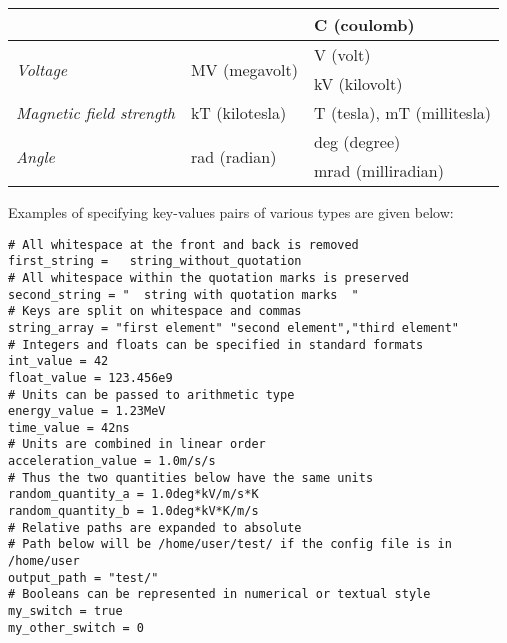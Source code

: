 \begin{table}[tbp]
\begin{tabular}{lll}
                                  &                                         & C (coulomb)              \\
\midrule
\multirow{2}{*}{\textit{Voltage}} & \multirow{2}{*}{MV (megavolt)}          & V (volt)                 \\
                                  &                                         & kV (kilovolt)            \\
\midrule
\textit{Magnetic field strength}  & kT (kilotesla)                          & T (tesla), mT (millitesla) \\
\midrule
\multirow{2}{*}{\textit{Angle}}   & \multirow{2}{*}{rad (radian)}           & deg (degree)             \\
                                  &                                         & mrad (milliradian)       \\
\bottomrule
\end{tabular}
\end{table}

Examples of specifying key-values pairs of various types are given below:
\begin{verbatim}
# All whitespace at the front and back is removed
first_string =   string_without_quotation
# All whitespace within the quotation marks is preserved
second_string = "  string with quotation marks  "
# Keys are split on whitespace and commas
string_array = "first element" "second element","third element"
# Integers and floats can be specified in standard formats
int_value = 42
float_value = 123.456e9
# Units can be passed to arithmetic type
energy_value = 1.23MeV
time_value = 42ns
# Units are combined in linear order
acceleration_value = 1.0m/s/s
# Thus the two quantities below have the same units
random_quantity_a = 1.0deg*kV/m/s*K
random_quantity_b = 1.0deg*kV*K/m/s
# Relative paths are expanded to absolute
# Path below will be /home/user/test/ if the config file is in /home/user
output_path = "test/"
# Booleans can be represented in numerical or textual style
my_switch = true
my_other_switch = 0
\end{verbatim}

